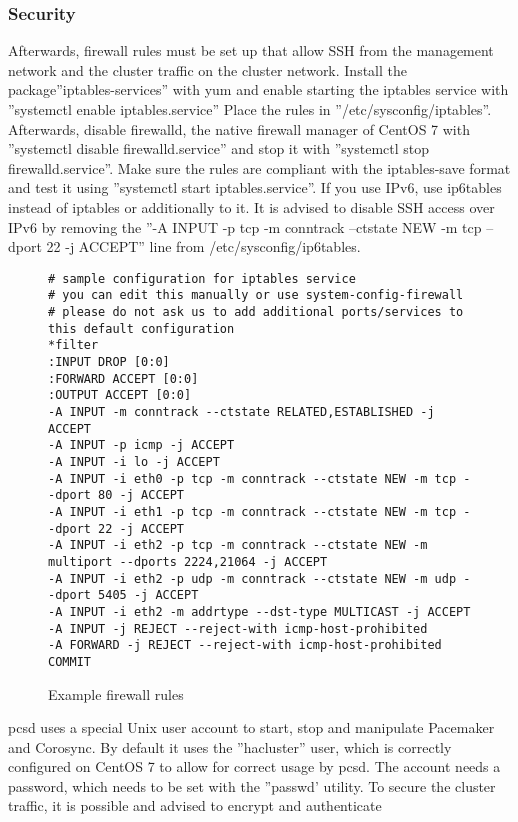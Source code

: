 \subsubsection{Security}
Afterwards, firewall rules must be set up that allow SSH from the management network
and the cluster traffic on the cluster network. Install the package''iptables-services'' with
yum and enable starting the iptables service with ''systemctl enable iptables.service''
Place the rules in ''/etc/sysconfig/iptables''. 
Afterwards, disable firewalld, the native firewall manager of CentOS 7 with ''systemctl disable firewalld.service''
and stop it with ''systemctl stop firewalld.service''.
Make sure the rules are compliant with the iptables-save format and test it using 
''systemctl start iptables.service''. 
If you use IPv6, use ip6tables instead of iptables or additionally to it. It is advised to disable SSH access over IPv6
by removing the ''-A INPUT -p tcp -m conntrack --ctstate NEW -m tcp --dport 22 -j ACCEPT'' line from /etc/sysconfig/ip6tables.
\begin{figure}
\begin{lstlisting}
# sample configuration for iptables service
# you can edit this manually or use system-config-firewall
# please do not ask us to add additional ports/services to this default configuration
*filter
:INPUT DROP [0:0]
:FORWARD ACCEPT [0:0]
:OUTPUT ACCEPT [0:0]
-A INPUT -m conntrack --ctstate RELATED,ESTABLISHED -j ACCEPT
-A INPUT -p icmp -j ACCEPT
-A INPUT -i lo -j ACCEPT
-A INPUT -i eth0 -p tcp -m conntrack --ctstate NEW -m tcp --dport 80 -j ACCEPT
-A INPUT -i eth1 -p tcp -m conntrack --ctstate NEW -m tcp --dport 22 -j ACCEPT
-A INPUT -i eth2 -p tcp -m conntrack --ctstate NEW -m multiport --dports 2224,21064 -j ACCEPT
-A INPUT -i eth2 -p udp -m conntrack --ctstate NEW -m udp --dport 5405 -j ACCEPT
-A INPUT -i eth2 -m addrtype --dst-type MULTICAST -j ACCEPT
-A INPUT -j REJECT --reject-with icmp-host-prohibited
-A FORWARD -j REJECT --reject-with icmp-host-prohibited
COMMIT
\end{lstlisting}
\caption{Example firewall rules}
\end{figure}
pcsd uses a special Unix user account to start, stop and manipulate Pacemaker
and Corosync. By default it uses the ''hacluster'' user, which is correctly
configured on CentOS 7 to allow for correct usage by pcsd.
The account needs a password, which needs to be set with the ''passwd' utility.
To secure the cluster traffic, it is possible and advised to encrypt and authenticate
